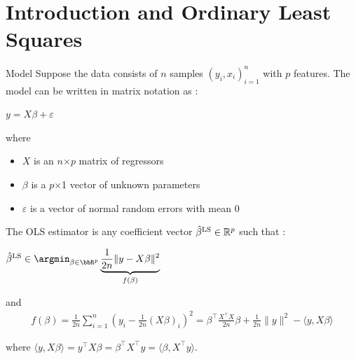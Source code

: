 \documentclass[unknownkeysallowed]{beamer}
\begin{document}




\section{Introduction and Ordinary Least Squares}
\label{sec:introdcution}



\begin{frame}{Model}
Suppose the data consists of $n$ samples $( y_i, x_i )^n_{i=1}$ with $p$ features.
\newline The model can be written in matrix notation as :
\begin{center}
$y=X\beta+\varepsilon$
\end{center}
where
 \begin{itemize}
        \item $X$ is an $n$$\times$$p$ matrix of regressors
        \item $\beta$  is a $p$$\times$1 vector of unknown parameters
        \item $\varepsilon$ is a vector of normal random errors with mean 0
    \end{itemize}
\end{frame}
\begin{frame}
The OLS estimator is any coefficient vector
$\hat\beta^{\rm LS}\in\mathbb{R}^p$ such that :
\newline
\begin{center}
$\hat\beta^{\rm LS} \in \argmin_{\beta \in \bbR^p}
\underbrace{\frac{1}{2n}\|y-X\beta\|^2 }_{f(\beta)}$
\end{center}
\vspace{0.5cm}

and
\begin{align*}
	f(\beta)
	= \frac{1}{2n}\sum_{i=1}^n (y_{i}-\frac{1}{2n}(X\beta)_{i})^2
	= \beta^{\top}\frac{X^{\top}X}{2n}\beta+\frac{1}{2n}\|y\|^2- \langle y,X\beta\rangle
\end{align*}

\vspace{0.5cm}
where
$\langle y,X\beta\rangle=y^{\top}X\beta=\beta^{\top}X^{\top}y=\langle \beta,X^{\top}y\rangle$.
\end{frame}
\end{document}
